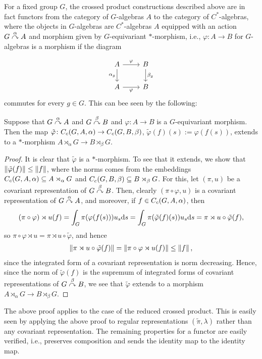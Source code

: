 For a fixed group $G$, the crossed product constructions described above are in fact functors from the category of $G$-algebras $A$ to the category of $C^*$-algebras, where the objects in $G$-algebras are $C^*$-algebras $A$ equipped with an action $G \stackrel{\alpha}{\curvearrowright} A$ and morphism given by $G$-equivariant $*$-morphism, i.e., $\varphi \colon A \to B$ for $G$-algebras is a morphism if the diagram

\begin{equation}
	\begin{tikzcd}
		A \arrow[r, "\varphi"] \arrow[d, "\alpha_g"'] & B  \arrow[d, "\beta_g"]\\
		A \arrow[r, "\varphi"'] & B
	\end{tikzcd}
\end{equation}
commutes for every $g \in G$. This can bee seen by the following:
\begin{proposition}
	Suppose that $G \stackrel{\alpha}{\curvearrowright} A$ and $G \stackrel{\beta}{\curvearrowright} B$ and $\varphi \colon A \to B$ is a $G$-equivariant morphism. Then the map $\tilde \varphi \colon C_c(G,A,\alpha) \to C_c(G,B,\beta)$, $\tilde \varphi (f)(s) := \varphi(f(s))$, extends to a $*$-morphism $A \rtimes_\alpha G \to B \rtimes_\beta G$.
\end{proposition}
\begin{proof}
	It is clear that $\tilde \varphi$ is a $*$-morphism. To see that it extends, we show that $\left\lVert \tilde \varphi(f) \right\rVert \leq \left\lVert f \right\rVert$, where the norms comes from the embeddings $C_c(G,A,\alpha) \subseteq A \rtimes_\alpha G$ and $C_c(G,B,\beta) \subseteq B \rtimes_\beta G$. For this, let $(\pi,u)$ be a covariant representation of $G \stackrel{\beta}{\curvearrowright} B$. Then, clearly $(\pi \circ \varphi , u)$ is a covariant representation of $G \stackrel{\alpha}{\curvearrowright} A$, and moreover, if $f \in C_c(G,A,\alpha)$, then
	\begin{align*}
		(\pi \circ \varphi) \rtimes u(f) = \int_G \pi(\varphi(f(s))) u_s \mathrm{d} s = \int _G \pi (\tilde \varphi(f)(s)) u_s \mathrm{d} s  =  \pi \rtimes u \circ \tilde \varphi (f),
	\end{align*}
	so $\pi \circ \varphi \rtimes u = \pi \rtimes u \circ \tilde \varphi$, and hence 
	\begin{align*}
		\left\lVert \pi \rtimes u \circ \tilde \varphi(f)\right\rVert = \left\lVert \pi \circ \varphi \rtimes u (f) \right\rVert \leq \left\lVert f \right\rVert,
	\end{align*}
	since the integrated form of a covariant representation is norm decreasing. Hence, since the norm of $ \tilde \varphi(f)$ is the supremum of integrated forms of covariant representations of $G \stackrel{\beta}{\curvearrowright} B$, we see that $\tilde \varphi$ extends to a morphism $A \rtimes_\alpha G \to B \rtimes_\beta G$.
\end{proof}
The above proof applies to the case of the reduced crossed product. This is easily seen by applying the above proof to regular representations $(\tilde \pi, \lambda)$ rather than any covariant representation. The remaining properties for a functor are easily verified, i.e., preserves composition and sends the identity map to the identity map.

